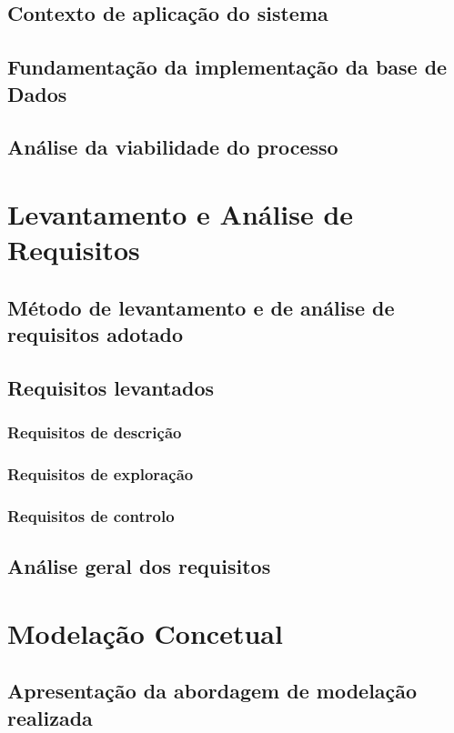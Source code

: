 \documentclass[a4paper]{article}
\begin{document}
\subsection{Contexto de aplicação do sistema}
\subsection{Fundamentação da implementação da base de Dados}
\subsection{Análise da viabilidade do processo}

\section{Levantamento e Análise de Requisitos}
\label{sec:2}

\subsection{Método de levantamento e de análise de requisitos adotado}

\subsection{Requisitos levantados}
\subsubsection{Requisitos de descrição}
\subsubsection{Requisitos de exploração}
\subsubsection{Requisitos de controlo}

\subsection{Análise geral dos requisitos}

\section{Modelação Concetual}
\label{sec:3}

\subsection{Apresentação da abordagem de modelação realizada}
\end{document}
